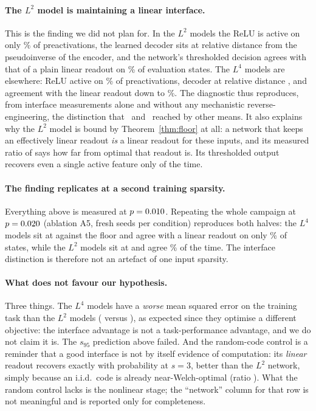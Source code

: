 \documentclass[preprint,12pt]{elsarticle}
\theoremstyle{definition}
\begin{document}
\paragraph{The $L^2$ model is maintaining a linear interface.} This is the finding we did not
plan for. In the $L^2$ models the ReLU is active on only \EfiveLtwoNegPre\% of preactivations,
the learned decoder sits at relative distance \EfiveLtwoWoutPinvDist{} from the pseudoinverse of
the encoder, and the network's thresholded decision agrees with that of a plain linear readout
on \EfiveLtwoAgreeLinear\% of evaluation states. The $L^4$ models are elsewhere: ReLU active on
\EfiveLfourNegPre\% of preactivations, decoder at relative distance \EfiveLfourWoutPinvDist,
and agreement with the linear readout down to \EfiveLfourAgreeLinear\%. The diagnostic thus
reproduces, from interface measurements alone and without any mechanistic reverse-engineering,
the distinction that~\cite{bhagat2026cc} and~\cite{ferreiradasilva2026l4} reached by other
means. It also explains why the $L^2$ model is bound by Theorem~\ref{thm:floor} at all: a
network that keeps an effectively linear readout \emph{is} a linear readout for these inputs,
and its measured ratio of \EfiveLtwoRatioLsMean{} says how far from optimal that readout is.
Its thresholded output recovers even a single active feature only \EfiveLtwoPmodelOne{} of the
time.

\paragraph{The finding replicates at a second training sparsity.} Everything above is measured
at $p=0.010$. Repeating the whole campaign at $p=0.020$ (ablation A5,
\EfiveSeeds{} fresh seeds per condition) reproduces both halves: the $L^4$ models sit at
\EfiveLfourSecRatioLsMean{} against the floor and agree with a linear readout on only
\EfiveLfourSecAgreeLinear\% of states, while the $L^2$ models sit at
\EfiveLtwoSecRatioLsMean{} and agree \EfiveLtwoSecAgreeLinear\% of the time. The interface
distinction is therefore not an artefact of one input sparsity.

\paragraph{What does not favour our hypothesis.} Three things. The $L^4$ models have a
\emph{worse} mean squared error on the training task than the $L^2$ models (\EfiveLfourMse{}
versus \EfiveLtwoMse), as expected since they optimise a different objective: the interface
advantage is not a task-performance advantage, and we do not claim it is. The $s_{95}$
prediction above failed. And the random-code control is a reminder that a good interface is not
by itself evidence of computation: its \emph{linear} readout recovers exactly with probability
\EfiveRandPlinThree{} at $s=3$, better than the $L^2$ network, simply because an i.i.d.\ code is
already near-Welch-optimal (ratio \EfiveRandRatioLsMean). What the random control lacks is the
nonlinear stage; the ``network'' column for that row is not meaningful and is reported only for
completeness.
\end{document}
